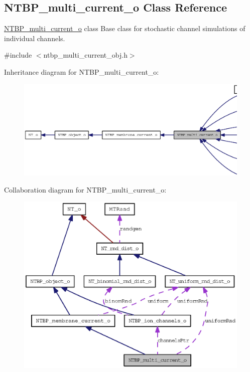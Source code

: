 \subsection{NTBP\_\-multi\_\-current\_\-o Class Reference}
\label{class_n_t_b_p__multi__current__o}


\hyperlink{class_n_t_b_p__multi__current__o}{NTBP\_\-multi\_\-current\_\-o} class Base class for stochastic channel simulations of individual channels.  




{\ttfamily \#include $<$ntbp\_\-multi\_\-current\_\-obj.h$>$}



Inheritance diagram for NTBP\_\-multi\_\-current\_\-o:
\nopagebreak
\begin{figure}[H]
\begin{center}
\leavevmode
\includegraphics[width=400pt]{class_n_t_b_p__multi__current__o__inherit__graph}
\end{center}
\end{figure}


Collaboration diagram for NTBP\_\-multi\_\-current\_\-o:
\nopagebreak
\begin{figure}[H]
\begin{center}
\leavevmode
\includegraphics[width=400pt]{class_n_t_b_p__multi__current__o__coll__graph}
\end{center}
\end{figure}
